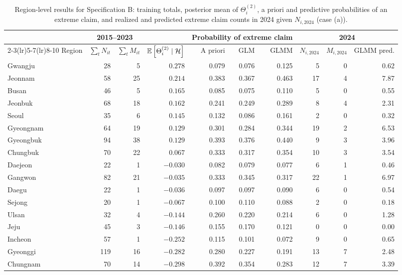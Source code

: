 \begin{table}[htbp]
\centering
\caption{Region-level results for Specification B: training totals,
posterior mean of \(\Theta_i^{(2)}\), a priori and predictive
probabilities of an extreme claim, and realized and predicted extreme
claim counts in 2024 given \(N_{i,2024}\) (case (a)).}
\label{tab.emp.region}
\footnotesize
\setlength{\tabcolsep}{4pt}
\begin{tabular}{lrrrrrrrrr}
\toprule
& \multicolumn{2}{c}{2015--2023} & & \multicolumn{3}{c}{Probability of extreme claim} & \multicolumn{3}{c}{2024}\\
\cmidrule(lr){2-3}\cmidrule(lr){5-7}\cmidrule(lr){8-10}
Region & \(\sum_tN_{it}\) & \(\sum_tM_{it}\) & \({\mathbb E}\left[\Theta_i^{(2)}\mid\mathcal H\right]\) & A priori & GLM & GLMM & \(N_{i,2024}\) & \(M_{i,2024}\) & GLMM pred.\\
\midrule
Gwangju & 28 & 5 & \(0.278\) & 0.079 & 0.076 & 0.125 & 5 & 0 & 0.62\\
Jeonnam & 58 & 25 & \(0.214\) & 0.383 & 0.367 & 0.463 & 17 & 4 & 7.87\\
Busan & 46 & 5 & \(0.165\) & 0.085 & 0.075 & 0.110 & 5 & 0 & 0.55\\
Jeonbuk & 68 & 18 & \(0.162\) & 0.241 & 0.249 & 0.289 & 8 & 4 & 2.31\\
Seoul & 35 & 6 & \(0.145\) & 0.132 & 0.086 & 0.161 & 2 & 0 & 0.32\\
Gyeongnam & 64 & 19 & \(0.129\) & 0.301 & 0.284 & 0.344 & 19 & 2 & 6.53\\
Gyeongbuk & 94 & 38 & \(0.129\) & 0.393 & 0.376 & 0.440 & 9 & 3 & 3.96\\
Chungbuk & 70 & 22 & \(0.067\) & 0.333 & 0.317 & 0.354 & 10 & 3 & 3.54\\
Daejeon & 22 & 1 & \(-0.030\) & 0.082 & 0.079 & 0.077 & 6 & 1 & 0.46\\
Gangwon & 82 & 21 & \(-0.035\) & 0.333 & 0.345 & 0.317 & 22 & 1 & 6.97\\
Daegu & 22 & 1 & \(-0.036\) & 0.097 & 0.097 & 0.090 & 6 & 0 & 0.54\\
Sejong & 20 & 1 & \(-0.067\) & 0.100 & 0.110 & 0.088 & 2 & 0 & 0.18\\
Ulsan & 32 & 4 & \(-0.144\) & 0.260 & 0.220 & 0.214 & 6 & 0 & 1.28\\
Jeju & 45 & 3 & \(-0.146\) & 0.155 & 0.170 & 0.121 & 0 & 0 & 0.00\\
Incheon & 57 & 1 & \(-0.252\) & 0.115 & 0.101 & 0.072 & 9 & 0 & 0.65\\
Gyeonggi & 119 & 16 & \(-0.282\) & 0.280 & 0.227 & 0.191 & 13 & 7 & 2.48\\
Chungnam & 70 & 14 & \(-0.298\) & 0.392 & 0.354 & 0.283 & 12 & 7 & 3.39\\
\bottomrule
\end{tabular}
\end{table}

